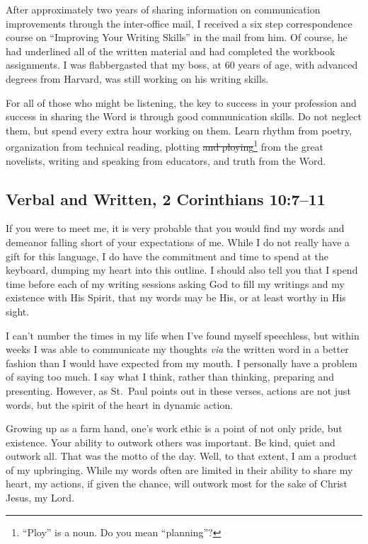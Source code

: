 \documentclass[12pt]{memoir}
\begin{document}
After approximately two years of sharing information on communication
improvements through the inter-office mail, I received a six step
correspondence course on ``Improving Your Writing Skills'' in the
mail from him. Of course, he had underlined all of the written material
and had completed the workbook assignments. I was flabbergasted that
my boss, at 60 years of age, with advanced degrees from Harvard, was still working on his writing skills.

For all of those who might be listening, the key to success in your
profession and success in sharing the Word is through good
communication skills. Do not neglect them, but spend every extra hour
working on them. Learn rhythm from poetry, organization from technical
reading, plotting \sout{and ploying}\footnote{``Ploy'' is a noun. Do you mean ``planning''?} from the great novelists, writing and
speaking from educators, and truth from the Word.

\subsection[Verbal and Written]{Verbal and Written, 2 Corinthians 10:7--11}

If you were to meet me, it is very probable that you would find my
words and demeanor falling short of your expectations of me. While
I do not really have a gift for this language, I do have the commitment
and time to spend at the keyboard, dumping my heart into this outline.
I should also tell you that I spend time before each of my writing
sessions asking God to fill my writings and my existence with His
Spirit, that my words may be His, or at least worthy in His sight.

I can't number the times in my life when I've found myself speechless,
but within weeks I was able to communicate my thoughts \emph{via} the written
word in a better fashion than I would have expected from my mouth.
I personally have a problem of saying too much. I say what I think,
rather than thinking, preparing and presenting.
 However, as St.~Paul
points out in these verses, actions are not just words, but the spirit of the heart in dynamic action.

Growing up as a farm hand, one's work ethic is a point of not only pride,
but existence. Your ability to outwork others was important.
Be kind, quiet and outwork all. That was the motto of the day. Well,
to that extent, I am a product of my upbringing.
While my words often are limited in their ability to share my heart, my actions, if given
the chance, will outwork most for the sake of Christ Jesus, my Lord.
\end{document}
